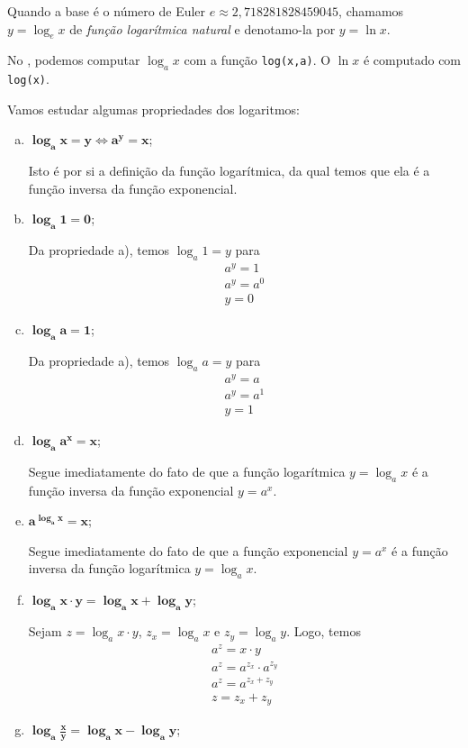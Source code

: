 \begin{obs}
  Quando a base é o número de Euler $e \approx 2,718281828459045$, chamamos $y = \log_e x$ de \emph{função logarítmica natural} e denotamo-la por $y = \ln x$.

  \ifispython
  No \sympy, podemos computar $\log_a x$ com a função \lstinline+log(x,a)+. O $\ln x$ é computado com \lstinline+log(x)+.
  \fi
\end{obs}

Vamos estudar algumas propriedades dos logaritmos:
\begin{enumerate}[a)]
\item $\displaystyle \pmb{\log_a x = y \Leftrightarrow a^y = x}$;

  Isto é por si a definição da função logarítmica, da qual temos que ela é a função inversa da função exponencial.
\item $\displaystyle \pmb{\log_a 1 = 0}$;

  Da propriedade a), temos $\log_a 1 = y$ para
  \begin{gather}
    a^y = 1\\
    a^y = a^0\\
    y = 0
  \end{gather}
\item $\displaystyle \pmb{\log_a a = 1}$;

  Da propriedade a), temos $\log_a a = y$ para
  \begin{gather}
    a^y = a\\
    a^y = a^1\\
    y = 1
  \end{gather}
\item $\displaystyle \pmb{\log_a a^x = x}$;

  Segue imediatamente do fato de que a função logarítmica $y = \log_a x$ é a função inversa da função exponencial $y = a^x$.
\item $\displaystyle \pmb{a^{\log_a x} = x}$;

  Segue imediatamente do fato de que a função exponencial $y = a^x$ é a função inversa da função logarítmica $y = \log_a x$.
\item $\displaystyle \pmb{\log_a x\cdot y = \log_a x + \log_a y}$;

  Sejam $z = \log_a x\cdot y$, $z_x = \log_a x$ e $z_y = \log_a y$. Logo, temos
  \begin{gather}
    a^z = x\cdot y\\
    a^z = a^{z_x}\cdot a^{z_y}\\
    a^z = a^{z_x+z_y}\\
    z = z_x + z_y
  \end{gather}
\item $\displaystyle \pmb{\log_a \frac{x}{y} = \log_a x - \log_a y}$;


\end{enumerate}
